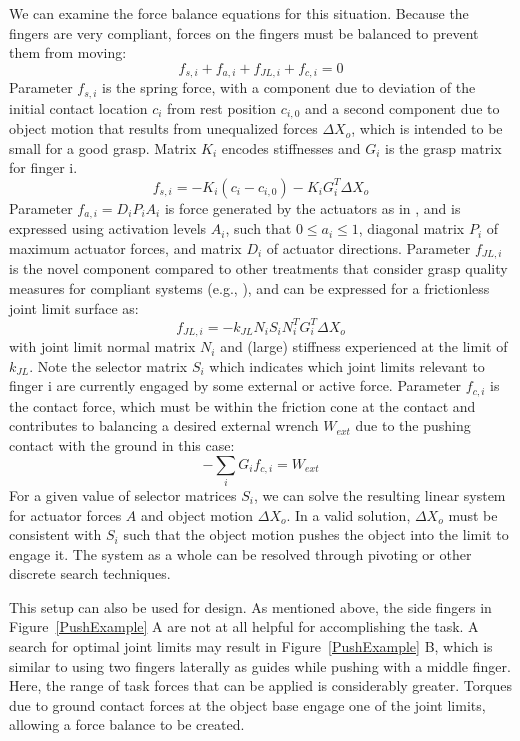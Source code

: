 We can examine the force balance equations for this situation.   Because the fingers are very compliant, forces on the fingers must be balanced to prevent them from moving:
\begin{equation}
    f_{s, i} +     f_{a, i} +     f_{JL, i} +     f_{c, i} = 0
\end{equation}
Parameter $f_{s, i}$ is the spring force, with a component due to deviation of the initial contact location $c_i$ from rest position $c_{i, 0}$ and a second component due to object motion that results from unequalized forces $\Delta X_o$, which is intended to be small for a good grasp.   Matrix $K_i$ encodes stiffnesses and $G_i$ is the grasp matrix for finger i.
\begin{equation}
 f_{s, i} = -K_i ( c_i - c_{i, 0}) - K_i G^T_i \Delta X_o
\end{equation}
Parameter $f_{a, i} = D_i P_i A_i$ is force generated by the actuators as in \cite{Li:graspDB07}, and is expressed using activation levels $A_i$, such that $0 \leq a_i \leq 1$, diagonal matrix $P_i$ of maximum actuator forces, and matrix $D_i$ of actuator directions.
Parameter $f_{JL, i}$ is the novel component compared to other treatments that consider grasp quality measures for compliant systems (e.g., \cite{lin2000stiffness}), and can be expressed for a frictionless joint limit surface as:
\begin{equation}
	f_{JL, i} = -k_{JL} N_i S_i N^T_i      G^T_i \Delta X_o
\end{equation}
with joint limit normal matrix $N_i$ and (large) stiffness experienced at the limit of $k_{JL}$.    Note the selector matrix $S_i$ which indicates which joint limits relevant to finger i are currently engaged by some external or active force.
Parameter $f_{c, i}$ is the contact force, which must be within the friction cone at the contact and contributes to balancing a desired external wrench $W_{ext}$ due to the pushing contact with the ground in this case:
\begin{equation}
  - \sum_i G_i f_{c, i} = W_{ext}
\end{equation}
For a given value of selector matrices $S_i$, we can solve the resulting linear system for actuator forces $A$ and object motion $\Delta X_o$.    In a valid solution, $\Delta X_o$ must be consistent with $S_i$ such that the object motion pushes the object into the limit to engage it.   The system as a whole can be resolved through pivoting or other discrete search techniques.

This setup can also be used for design.   As mentioned above, the side fingers in Figure~\ref{PushExample} A are not at all helpful for accomplishing the task.  A search for optimal joint limits may result in Figure~\ref{PushExample} B, which is similar to using two fingers laterally as guides while pushing with a middle finger.   Here, the range of task forces that can be applied is considerably greater.     Torques due to ground contact forces at the object base engage one of the joint limits, allowing a force balance to be created.


